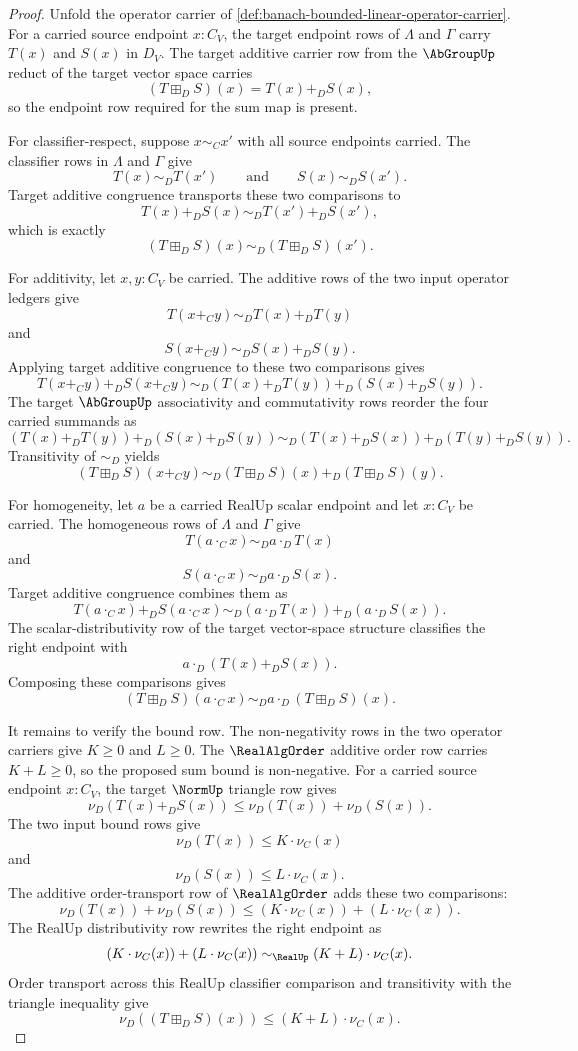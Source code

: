\begin{proof}
Unfold the operator carrier of
\autoref{def:banach-bounded-linear-operator-carrier}. For a carried source
endpoint $x:C_V$, the target endpoint rows of $\Lambda$ and $\Gamma$ carry
$T(x)$ and $S(x)$ in $D_V$. The target additive carrier row from the
$\AbGroupUp$ reduct of the target vector space carries
$$
(T\boxplus_D S)(x)=T(x)+_D S(x),
$$
so the endpoint row required for the sum map is present.

For classifier-respect, suppose $x\sim_Cx'$ with all source endpoints carried.
The classifier rows in $\Lambda$ and $\Gamma$ give
$$
T(x)\sim_D T(x')
\qquad\text{and}\qquad
S(x)\sim_D S(x').
$$
Target additive congruence transports these two comparisons to
$$
T(x)+_D S(x)\sim_D T(x')+_D S(x'),
$$
which is exactly
$$
(T\boxplus_D S)(x)\sim_D(T\boxplus_D S)(x').
$$

For additivity, let $x,y:C_V$ be carried. The additive rows of the two input
operator ledgers give
$$
T(x+_C y)\sim_D T(x)+_D T(y)
$$
and
$$
S(x+_C y)\sim_D S(x)+_D S(y).
$$
Applying target additive congruence to these two comparisons gives
$$
T(x+_C y)+_D S(x+_C y)
\sim_D
(T(x)+_D T(y))+_D(S(x)+_D S(y)).
$$
The target $\AbGroupUp$ associativity and commutativity rows reorder the four
carried summands as
$$
(T(x)+_D T(y))+_D(S(x)+_D S(y))
\sim_D
(T(x)+_D S(x))+_D(T(y)+_D S(y)).
$$
Transitivity of $\sim_D$ yields
$$
(T\boxplus_D S)(x+_C y)
\sim_D
(T\boxplus_D S)(x)+_D(T\boxplus_D S)(y).
$$

For homogeneity, let $a$ be a carried RealUp scalar endpoint and let
$x:C_V$ be carried. The homogeneous rows of $\Lambda$ and $\Gamma$ give
$$
T(a\cdot_C x)\sim_D a\cdot_D T(x)
$$
and
$$
S(a\cdot_C x)\sim_D a\cdot_D S(x).
$$
Target additive congruence combines them as
$$
T(a\cdot_C x)+_D S(a\cdot_C x)
\sim_D
(a\cdot_D T(x))+_D(a\cdot_D S(x)).
$$
The scalar-distributivity row of the target vector-space structure classifies
the right endpoint with
$$
a\cdot_D(T(x)+_D S(x)).
$$
Composing these comparisons gives
$$
(T\boxplus_D S)(a\cdot_C x)
\sim_D
 a\cdot_D(T\boxplus_D S)(x).
$$

It remains to verify the bound row. The non-negativity rows in the two
operator carriers give $K\ge0$ and $L\ge0$. The $\RealAlgOrder$ additive
order row carries $K+L\ge0$, so the proposed sum bound is non-negative.
For a carried source endpoint $x:C_V$, the target $\NormUp$ triangle row gives
$$
\nu_D(T(x)+_D S(x))\le \nu_D(T(x))+\nu_D(S(x)).
$$
The two input bound rows give
$$
\nu_D(T(x))\le K\cdot\nu_C(x)
$$
and
$$
\nu_D(S(x))\le L\cdot\nu_C(x).
$$
The additive order-transport row of $\RealAlgOrder$ adds these two comparisons:
$$
\nu_D(T(x))+\nu_D(S(x))
\le
(K\cdot\nu_C(x))+(L\cdot\nu_C(x)).
$$
The RealUp distributivity row rewrites the right endpoint as
$$
(K\cdot\nu_C(x))+(L\cdot\nu_C(x))
\sim_{\RealUp}
(K+L)\cdot\nu_C(x).
$$
Order transport across this RealUp classifier comparison and transitivity with
the triangle inequality give
$$
\nu_D((T\boxplus_D S)(x))\le (K+L)\cdot\nu_C(x).
$$


\end{proof}
